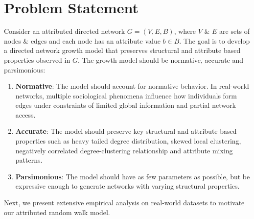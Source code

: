 \section{Problem Statement}
\label{sec:Problem Statement}

Consider an attributed directed network $G=(V,E,B)$, where $V$ \& $E$ are
sets of nodes \& edges and each node has an attribute value $b \in B$.
The goal is to develop a directed network growth model that preserves structural
and attribute based properties observed in $G$. The growth model should be
normative, accurate and parsimonious:
\begin{enumerate}
    \item \textbf{Normative}: The model should account for normative behavior. In real-world
    networks, multiple sociological phenomena influence how individuals form edges under
    constraints of limited global information and partial network access.
    \item \textbf{Accurate}: The model should preserve key structural
    and attribute based properties such as heavy tailed degree distribution, skewed
    local clustering, negatively correlated degree-clustering relationship
    and attribute mixing patterns.
    \item \textbf{Parsimonious}: The model should have as few parameters as possible, but be expressive enough to generate networks with varying structural properties.
\end{enumerate}

Next, we present extensive empirical analysis on real-world datasets to motivate our attributed random walk model.

